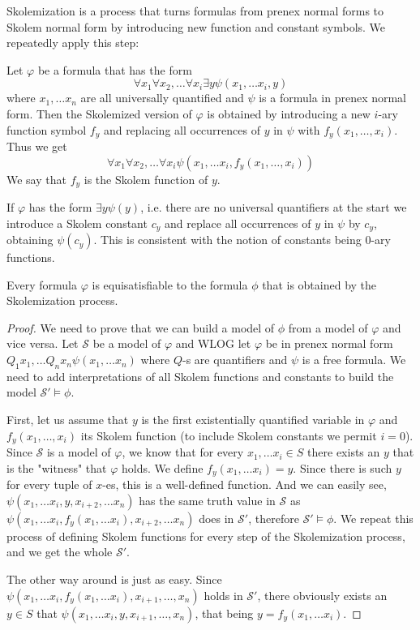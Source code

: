 Skolemization is a process that turns formulas from prenex normal forms to Skolem normal form by introducing new function and constant symbols. We repeatedly apply this step:

Let $\varphi$ be a formula that has the form $$\forall x_1\forall x_2,\dots \forall x_{i}\exists y\psi(x_1,\dots x_i,y)$$ where $x_1,\dots x_n$ are all universally quantified and $\psi$ is a formula in prenex normal form. Then the Skolemized version of $\varphi$ is obtained by introducing a new $i$-ary function symbol $f_y$ and replacing all occurrences of $y$ in $\psi$ with $f_y(x_1,\dots,x_i)$. Thus we get $$\forall x_1\forall x_2,\dots \forall x_{i}\psi(x_1,\dots x_i,f_y(x_1,\dots,x_i))$$ We say that $f_y$ is the Skolem function of $y$.

If $\varphi$ has the form $\exists y \psi(y)$, i.e. there are no universal quantifiers at the start we introduce a Skolem constant $c_y$ and replace all occurrences of $y$ in $\psi$ by $c_y$, obtaining $\psi(c_y)$. This is consistent with the notion of constants being $0$-ary functions.

\begin{thm}
	Every formula $\varphi$ is equisatisfiable to the formula $\phi$ that is obtained by the Skolemization process.
\end{thm}
\begin{proof}
	We need to prove that we can build a model of $\phi$ from a model of $\varphi$ and vice versa. Let $\mathcal{S}$ be a model of $\varphi$ and WLOG let $\varphi$ be in prenex normal form $Q_1x_1,\dots Q_nx_n\psi(x_1,\dots x_n)$ where $Q$-s are quantifiers and $\psi$ is a free formula. We need to add interpretations of all Skolem functions and constants to build the model $\mathcal{S}'\models\phi$. 
	
First, let us assume that $y$ is the first existentially quantified variable in $\varphi$ and $f_y(x_1,\dots,x_i)$ its Skolem function (to include Skolem constants we permit $i=0$). Since $\mathcal{S}$ is a model of $\varphi$, we know that for every $x_1,\dots x_i\in S$ there exists an $y$ that is the "witness" that $\varphi$ holds. We define $f_y(x_1,\dots x_i)=y$. Since there is such $y$ for every tuple of $x$-es, this is a well-defined function. And we can easily see, $\psi(x_1,\dots x_i,y,x_{i+2},\dots x_n)$ has the same truth value in $\mathcal{S}$ as $\psi(x_1,\dots x_i,f_y(x_1,\dots x_i),x_{i+2},\dots x_n)$ does in $\mathcal{S}'$, therefore $\mathcal{S}'\models\phi$. We repeat this process of defining Skolem functions for every step of the Skolemization process, and we get the whole $\mathcal{S}'$.

The other way around is just as easy. Since $\psi(x_1,\dots x_i,f_y(x_1,\dots x_i), x_{i+1},\dots,x_n)$ holds in $\mathcal{S}'$, there obviously exists an $y\in S$ that $\psi(x_1,\dots x_i,y, x_{i+1},\dots,x_n)$, that being $y=f_y(x_1,\dots x_i)$.
\end{proof}

